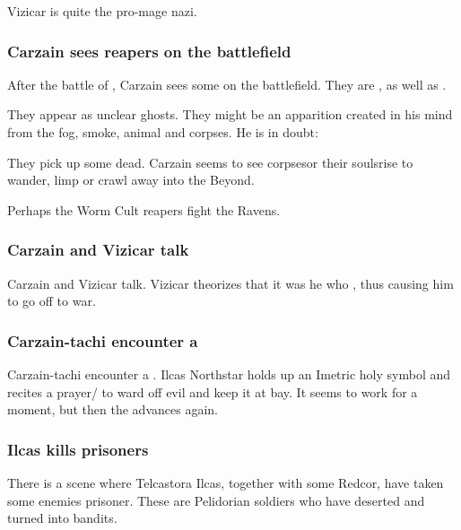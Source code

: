 
Vizicar is quite the pro-mage nazi. 







\subsubsection{Carzain sees reapers on the battlefield}
After the battle of \Forclin, Carzain sees some  on the battlefield. They are , as well as . 

They appear as unclear ghosts. They might be an apparition created in his mind from the fog, smoke, animal and corpses. He is in doubt: 

They pick up some dead. Carzain seems to see corpses\dash or their souls\dash rise to wander, limp or crawl away into the Beyond. 

Perhaps the Worm Cult reapers fight the Ravens. 





\subsubsection{Carzain and Vizicar talk}
Carzain and Vizicar talk. 
Vizicar theorizes that it was he who , thus causing him to go off to war. 





\subsubsection{Carzain-tachi encounter a \bane}
Carzain-tachi encounter a \bane. 
Ilcas Northstar holds up an Imetric holy symbol and recites a prayer/ to ward off evil and keep it at bay. 
It seems to work for a moment, but then the \bane{} advances again. 





\subsubsection{Ilcas kills prisoners}
There is a scene where Telcastora Ilcas, together with some Redcor, have taken some enemies prisoner. 
These are Pelidorian soldiers who have deserted and turned into bandits. 

